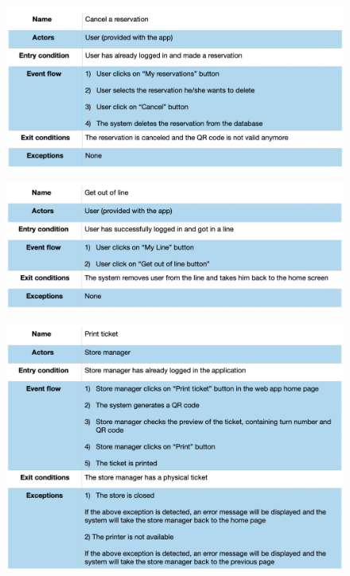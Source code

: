 \documentclass{article}
\begin{document}
\begin{figure}[H]
  \includegraphics[width=\linewidth]{CancelReservationUseCase.png}
  
\end{figure}

\begin{figure}[H]
  \includegraphics[width=\linewidth]{GetOutLineUseCase.png}
  
\end{figure}

\begin{figure}[H]
  \includegraphics[width=\linewidth]{PrintTicketUseCase.png}
  
\end{figure}
\end{document}
